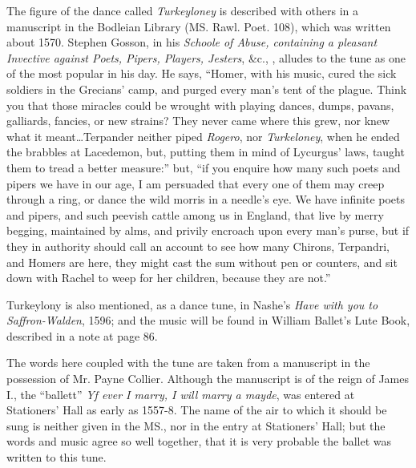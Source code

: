 
The figure of the dance called \textit{Turkeyloney} is described with others in a manu\-script
in the Bodleian Library (MS. Rawl. Poet. 108), which was written about
1570. Stephen Gosson, in his \textit{Schoole of Abuse, containing a pleasant Invective
against Poets, Pipers, Players, Jesters}, \&c., , alludes to the tune as one of
the most popular in his day. He says, “Homer, with his music, cured the sick
soldiers in the Grecians’ camp, and purged every man’s tent of the plague.
Think you that those miracles could be wrought with playing dances, dumps,
pavans, galliards, fancies, or new strains? They never came where this grew,
nor knew what it meant\dots Terpander neither piped \textit{Rogero}, nor \textit{Turkeloney},
when he ended the brabbles at Lacedemon, but, putting them in mind of Lycurgus’
laws, taught them to tread a better measure:” but, “if you enquire how many
such poets and pipers we have in our age, I am persuaded that every one of them
may creep through a ring, or dance the wild morris in a needle’s eye. We have
infinite poets and pipers, and such peevish cattle among us in England, that live
by merry begging, maintained by alms, and privily encroach upon every man’s
purse, but if they in authority should call an account to see how many Chirons,
Terpandri, and Homers are here, they might cast the sum without pen or
counters, and sit down with Rachel to weep for her children, because they are not.”

Turkeylony is also mentioned, as a dance tune, in Nashe’s \textit{Have with you to
Saffron-Walden}, 1596; and the music will be found in William Ballet’s Lute
Book, described in a note at page 86.

The words here coupled with the tune are taken from a manuscript in the
possession of Mr. Payne Collier. Although the manuscript is of the reign of
James I., the “ballett” \textit{Yf ever I marry, I will marry a mayde}, was entered
at Stationers’ Hall as early as 1557-8. The name of the air to which it should
be sung is neither given in the MS., nor in the entry at Stationers’ Hall; but the
words and music agree so well together, that it is very probable the ballet was
written to this tune.


\smallskip


